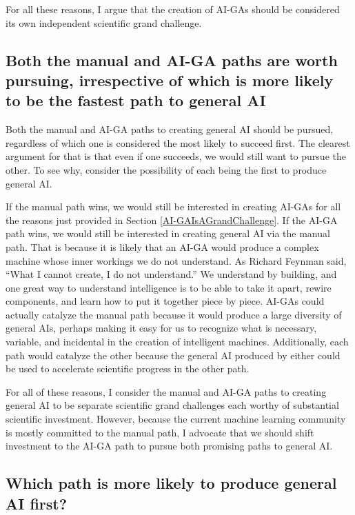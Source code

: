 \documentclass{article}
\begin{document}
For all these reasons, I argue that the creation of AI-GAs should be considered its own independent scientific grand challenge. 

\subsection{Both the manual and AI-GA paths are worth pursuing, irrespective of which is more likely to be the fastest path to general AI}
\label{bothPathsWorthwhile}

Both the manual and AI-GA paths to creating general AI should be pursued, regardless of which one is considered the most likely to succeed first. The clearest argument for that is that even if one succeeds, we would still want to pursue the other. To see why, consider the possibility of each being the first to produce general AI. 

If the manual path wins, we would still be interested in creating AI-GAs for all the reasons just provided in Section \ref{AI-GAIsAGrandChallenge}. If the AI-GA path wins, we would still be interested in creating general AI via the manual path. That is because it is likely that an AI-GA would produce a complex machine whose inner workings we do not understand. As Richard Feynman said, ``What I cannot create, I do not understand.'' We understand by building, and one great way to understand intelligence is to be able to take it apart, rewire components, and learn how to put it together piece by piece. AI-GAs could actually catalyze the manual path because it would produce a large diversity of general AIs, perhaps making it easy for us to recognize what is necessary, variable, and incidental in the creation of intelligent machines.  Additionally, each path would catalyze the other because the general AI produced by either could be used to accelerate scientific progress in the other path. 

For all of these reasons, I consider the manual and AI-GA paths to creating general AI to be separate scientific grand challenges each worthy of substantial scientific investment. However, because the current machine learning community is mostly committed to the manual path, I advocate that we should shift investment to the AI-GA path to pursue both promising paths to general AI. 

\subsection{Which path is more likely to produce general AI first?}
\label{whichIsFastest}
\end{document}
